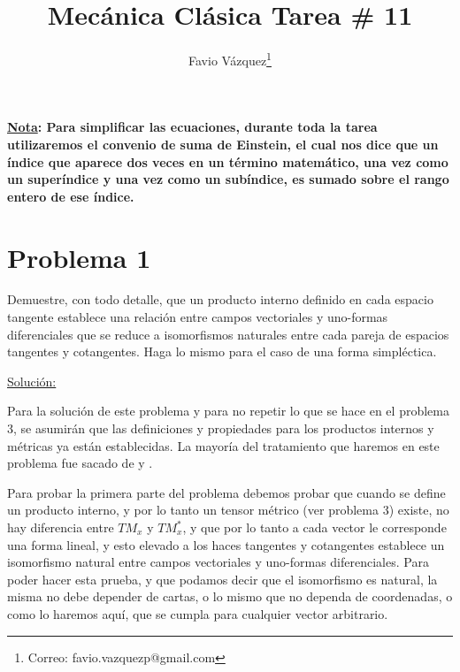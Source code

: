 \documentclass[a4paper,10pt]{article}
\title{Mecánica Clásica Tarea \# 11}
\author{Favio Vázquez\thanks{Correo: favio.vazquezp@gmail.com}}\affil{Instituto de Ciencias Nucleares. Universidad Nacional Autónoma de México.}
\date{}
\numberwithin{equation}{section}
\begin{document}
\makeatletter
\def\@maketitle{%
  \newpage
  \null
  \vskip 2em%
  \begin{center}%
  \let \footnote \thanks
    {\Large\bfseries \@title \par}%
    \vskip 1.5em%
    {\normalsize
      \lineskip .5em%
      \begin{tabular}[t]{c}%
        \@author
      \end{tabular}\par}%
    \vskip 1em%
    {\normalsize \@date}%
  \end{center}%
  \par
  \vskip 1.5em}
\makeatother

\maketitle

\textbf{\underline{Nota}: Para simplificar las ecuaciones, durante toda la tarea 
utilizaremos el convenio de suma de Einstein, el cual nos dice 
que un índice que aparece dos veces en un término matemático, una vez como un 
superíndice y una vez como un subíndice, es sumado sobre el rango entero de ese 
índice.}

\section{Problema 1}

Demuestre, con todo detalle, que un producto interno definido en cada espacio tangente 
establece una relación entre campos vectoriales y uno-formas diferenciales que se reduce 
a isomorfismos naturales entre cada pareja de espacios tangentes y cotangentes. Haga lo 
mismo para el caso de una forma simpléctica. 

\vspace{.3cm}

\underline{Solución:} \vspace{.3cm}

Para la solución de este problema y para no repetir lo que se hace en el
problema 3, se asumirán que las definiciones y propiedades para los productos 
internos y métricas ya están establecidas. La mayoría del tratamiento 
que haremos en este problema fue sacado de \cite{rasband} y \cite{spivak}.

\vspace{.3cm}

Para probar la primera parte del problema debemos probar que cuando 
se define un producto interno, y por lo tanto un tensor métrico (ver problema 3) 
existe, no hay diferencia entre $TM_x$ y $TM_x^*$, y que por lo tanto 
a cada vector le corresponde una forma lineal, y esto elevado a los haces 
tangentes y cotangentes establece un isomorfismo natural entre campos vectoriales 
y uno-formas diferenciales. Para poder hacer esta prueba, y que podamos decir 
que el isomorfismo es natural, la misma no debe depender de cartas, o lo mismo 
que no dependa de coordenadas, o como lo haremos aquí, que se cumpla para 
cualquier vector arbitrario.
\end{document}
